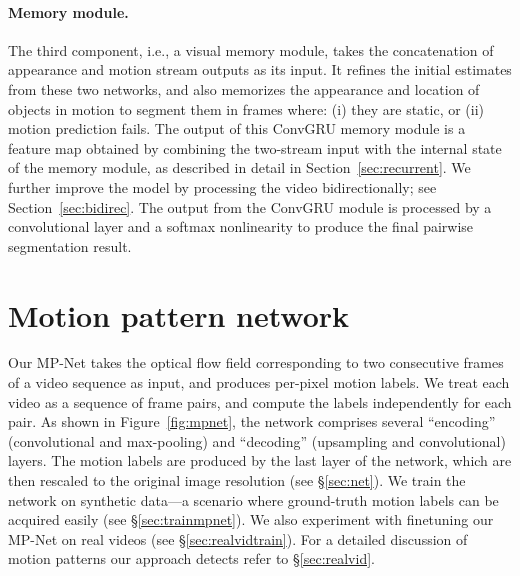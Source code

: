 \paragraph{\bf Memory module.}
The third component, i.e., a visual memory module, takes the concatenation of appearance and motion stream outputs as its input. It refines the initial
estimates from these two networks, and also memorizes the appearance and
location of objects in motion to segment them in frames where: (i) they are
static, or (ii) motion prediction fails. The output of this ConvGRU memory
module is a  feature map obtained by
combining the two-stream input with the internal state of the memory module, as
described in detail in Section~\ref{sec:recurrent}. We further improve the
model by processing the video bidirectionally; see Section~\ref{sec:bidirec}.
The output from the ConvGRU module is processed by a  convolutional
layer and a softmax nonlinearity to produce the final pairwise segmentation
result.

\section{Motion pattern network}
\label{sec:mpnet}
Our MP-Net takes the optical flow field corresponding to two consecutive frames
of a video sequence as input, and produces per-pixel motion labels. We treat
each video as a sequence of frame pairs, and compute the labels independently
for each pair. As shown in Figure~\ref{fig:mpnet}, the network comprises
several ``encoding'' (convolutional and max-pooling) and ``decoding''
(upsampling and convolutional) layers. The motion labels are produced by the
last layer of the network, which are then rescaled to the original image
resolution (see \S\ref{sec:net}). We train the network on synthetic
data---a scenario where ground-truth motion labels can be acquired easily (see
\S\ref{sec:trainmpnet}). We also experiment with finetuning our MP-Net on real videos (see \S\ref{sec:realvidtrain}). For a detailed discussion of  motion patterns our approach detects refer to \S\ref{sec:realvid}.


